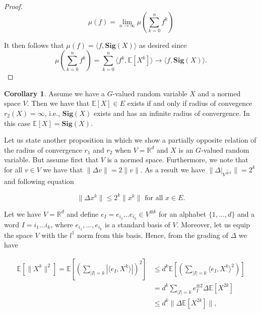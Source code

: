 \documentclass[12pt,a4paper]{report}
\theoremstyle{definition}
\newtheorem{corollary}{Corollary}
\begin{document}
\begin{proof}
\begin{equation}
	\mu(f)=\lim_{n\rightarrow \infty}\mu(\sum_{k=0}^{n}f^k)
\end{equation}

It then follows that $\mu(f) = \langle f,\textbf{Sig}(X) \rangle$ as desired since
\begin{equation}
	\mu(\sum_{k=0}^{n}f^k)=\sum_{k=0}^{n}\langle f^k,\mathbb{E}[X^k] \rangle \rightarrow\langle f,\textbf{Sig}(X) \rangle.
\end{equation}

\end{proof}


\begin{corollary}\parencite[see][]{chevyrev2016characteristic}\label{Cor3.3}	
	Assume we have a $G$-valued random variable $X$ and a normed space $V$. Then we have that $\mathbb{E}[X] \in E$ exists if and only if radius of convegence $r_2(X) = \infty$, i.e., $\textbf{Sig}(X)$ exists and has an infinite radius of convergence. In this case $\mathbb{E}[X] = \textbf{Sig}(X)$.
\end{corollary}

Let us state another proposition in which we show a partially opposite relation of the radius of convergence  $r_1$ and $r_2$ when $V=\mathbb{R}^d$ and $X$ is an $G$-valued random variable. But assume first that $V$ is a normed space. Furthermore, we note that for all $v\in V$ we have that $\|\Delta v\|=2\|v \|$. As a result we have $\|\Delta|_{V^{\hat{\otimes}k}}\|=2^k$ and following equation

\begin{equation}\label{2.2.4}
	\|\Delta x^k\|\leq 2^k \|x^k\| \text{ for all } x \in E.
\end{equation}


Let we have $V=\mathbb{R}^d$ and define $e_I=e_{i_1}...e_{i_k} \in V^{\otimes k}$ for an alphabet $\{1,...,d\}$ and a word $I=i_1...i_k$, where $e_{i_1},...,e_{i_k}$ is a standard basis of $V$.  Moreover, let us equip the space $V$ with the $l^1$ norm from this basis. Hence, from the grading of $\Delta$ we have

\begin{equation}
	\begin{aligned}
	\mathbb{E}[\|X^k \|^2]=\mathbb{E}[(\sum_{|I|=k}|\langle e_I,X^k\rangle |)^2]&\leq d^k \mathbb{E}[(\sum_{|I|=k}\langle e_I,X^k\rangle ^2)]\\&=d^k \sum_{|I|=k} e_I^{\otimes 2} \Delta \mathbb{E}[X^{2k}]\\ &\leq d^k\|\Delta \mathbb{E}[X^{2k} ]\|,
	\end{aligned}
\end{equation}
\end{document}
